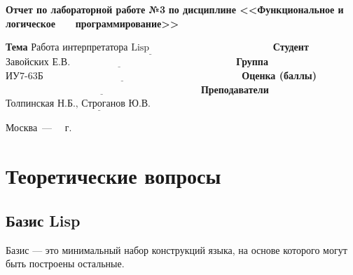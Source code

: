 \documentclass[12pt]{report}
\begin{document}
\begin{titlepage}
		\begin{center}
			\noindent\begin{minipage}{1.1\textwidth}\centering
				\Large\textbf{  Отчет по лабораторной работе №3}\newline
				\textbf{по дисциплине <<Функциональное и логическое}\newline
				\textbf{~~~программирование>>}\newline\newline
			\end{minipage}
		\end{center}
		
		\noindent\textbf{Тема} $\underline{\text{Работа интерпретатора Lisp~~~~~~~~~~~~~~~~~~~~~~~~~~~~~~~~~~~~~}}$\newline\newline
		\noindent\textbf{Студент} $\underline{\text{Завойских Е.В.~~~~~~~~~~~~~~~~~~~~~~~~~~~~~~~~~~~~~~~~~~~~~~~~~~}}$\newline\newline
		\noindent\textbf{Группа} $\underline{\text{ИУ7-63Б~~~~~~~~~~~~~~~~~~~~~~~~~~~~~~~~~~~~~~~~~~~~~~~~~~~~~~~~~~~~}}$\newline\newline
		\noindent\textbf{Оценка (баллы)} $\underline{\text{~~~~~~~~~~~~~~~~~~~~~~~~~~~~~~~~~~~~~~~~~~~~~~~~~~~~~~~~~~~}}$\newline\newline
		\noindent\textbf{Преподаватели} $\underline{\text{Толпинская Н.Б., Строганов Ю.В.~~~~~~~~~~~~~}}$\newline\newline\newline
		
		\begin{center}
			\vfill
			Москва~---~\the\year
			~г.
		\end{center}
	\end{titlepage}
	
\chapter{Теоретические вопросы}
	
\section{Базис Lisp}

Базис --- это минимальный набор конструкций языка, на основе которого могут быть построены остальные.
\end{document}

